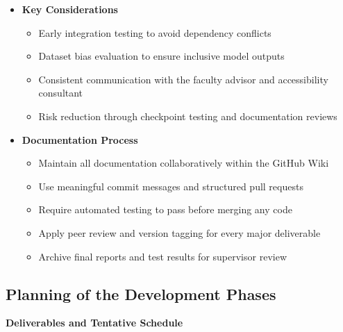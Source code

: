 \documentclass[12pt]{article}
\begin{document}
\begin{itemize}
  \item \textbf{Key Considerations}
    \begin{itemize}
      \item Early integration testing to avoid dependency conflicts
      \item Dataset bias evaluation to ensure inclusive model outputs
      \item Consistent communication with the faculty advisor and
        accessibility consultant
      \item Risk reduction through checkpoint testing and documentation reviews
    \end{itemize}

  \item \textbf{Documentation Process}
    \begin{itemize}
      \item Maintain all documentation collaboratively within the GitHub Wiki
      \item Use meaningful commit messages and structured pull requests
      \item Require automated testing to pass before merging any code
      \item Apply peer review and version tagging for every major deliverable
      \item Archive final reports and test results for supervisor review
    \end{itemize}
\end{itemize}

\subsection{Planning of the Development Phases}

\textbf{Deliverables and Tentative Schedule}
\end{document}
